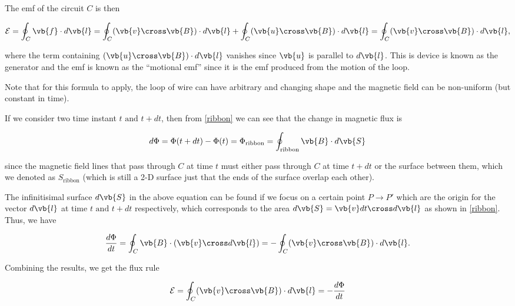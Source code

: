 \documentclass[english,a4paper,12pt]{report}
\begin{document}
The emf of the circuit \(C\) is then 

\begin{equation}
    \mathcal{E} = \oint_{C} \vb{f} \cdot d \vb{l} = \oint_{C} (\vb{v} \cross \vb{B} ) \cdot d \vb{l}  + \oint_{C} (\vb{u} \cross \vb{B} ) \cdot d \vb{l} = \oint_{C} (\vb{v} \cross \vb{B} ) \cdot d \vb{l} ,
\end{equation}

where the term containing \((\vb{u} \cross \vb{B} )\cdot d\vb{l} \) vanishes since \(\vb{u}\) is parallel to \(d \vb{l} \). This is device is known as the generator and the emf is known as the ``motional emf'' since it is the emf produced from the motion of the loop.

Note that for this formula to apply, the loop of wire can have arbitrary and changing shape and the magnetic field can be non-uniform (but constant in time). 

If we consider two time instant \(t \text { and } t+dt\), then from \cref{ribbon} we can see that the change in magnetic flux is


\begin{equation}
    d\Phi = \Phi (t+dt) - \Phi (t) = \Phi _{\text{ribbon}} = \oint_{\text{ribbon} } \vb{B} \cdot d \vb{S} 
\end{equation}

since the magnetic field lines that pass through \(C\) at time \(t\) must either pass through \(C\) at time \(t+dt\) or the surface between them, which we denoted as \(S _{\text{ribbon} } \) (which is still a 2-D surface just that the ends of the surface overlap each other). 

The infinitisimal surface \(d \vb{S} \) in the above equation can be found if we focus on a certain point \(P \rightarrow P'\) which are the origin for the vector \(d \vb{l} \) at time \(t \text { and }  t+dt\) respectively, which corresponds to the area \(d\vb{S} = \vb{v} dt \cross d\vb{l} \) as shown in \cref{ribbon}. Thus, we have

\begin{equation}
    \frac{d\Phi }{dt} = \oint_{C} \vb{B} \cdot (\vb{v} \cross d \vb{l} ) = -\oint_{C} (\vb{v} \cross \vb{B} ) \cdot d \vb{l}.    
\end{equation}

Combining the results, we get the flux rule

\begin{equation} \label{motionalemf} 
    \mathcal{E} = \oint_{C} (\vb{v} \cross \vb{B} )\cdot d \vb{l} = -\frac{d\Phi }{dt}
\end{equation}
\end{document}
